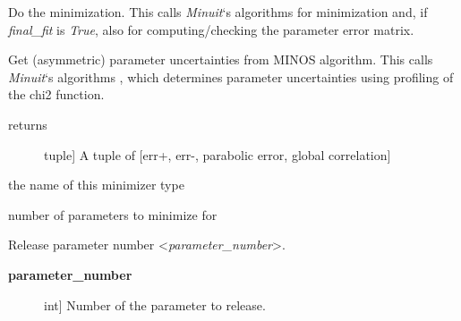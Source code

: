 \documentclass[a4paper,10pt,english]{sphinxmanual}
\begin{document}
\begin{fulllineitems}

\begin{fulllineitems}
\label{module_doc:kafe.minuit.Minuit.minimize}
Do the minimization. This calls \emph{Minuit}`s algorithms 
for minimization and, if \emph{final\_fit} is \emph{True}, also 
for computing/checking the parameter error matrix.

\end{fulllineitems}


\begin{fulllineitems}
\label{module_doc:kafe.minuit.Minuit.minos_errors}
Get (asymmetric) parameter uncertainties from MINOS
algorithm. This calls \emph{Minuit}`s algorithms ,
which determines parameter uncertainties using profiling
of the chi2 function.
\begin{description}
\item[{returns}] \leavevmode{[}tuple{]}
A tuple of {[}err+, err-, parabolic error, global correlation{]}

\end{description}

\end{fulllineitems}


\begin{fulllineitems}
\label{module_doc:kafe.minuit.Minuit.name}
the name of this minimizer type

\end{fulllineitems}


\begin{fulllineitems}
\label{module_doc:kafe.minuit.Minuit.number_of_parameters}
number of parameters to minimize for

\end{fulllineitems}


\begin{fulllineitems}
\label{module_doc:kafe.minuit.Minuit.release_parameter}
Release parameter number \textless{}\emph{parameter\_number}\textgreater{}.
\begin{description}
\item[{\textbf{parameter\_number}}] \leavevmode{[}int{]}
Number of the parameter to release.


\end{description}
\end{fulllineitems}
\end{fulllineitems}
\end{document}
